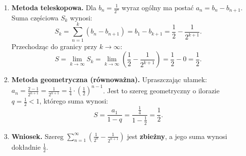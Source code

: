 \begin{enumerate}[label=\textbf{Krok \arabic*.},leftmargin=*]
    \item \textbf{Metoda teleskopowa.}
    Dla $b_n = \frac{1}{2^n}$ wyraz ogólny ma postać $a_n = b_n - b_{n+1}$. Suma częściowa $S_k$ wynosi:
    \begin{equation*}
        S_k = \sum_{n=1}^{k} (b_n - b_{n+1}) = b_1 - b_{k+1} = \frac{1}{2} - \frac{1}{2^{k+1}}.
    \end{equation*}
    Przechodząc do granicy przy $k \to \infty$:
    \begin{equation*}
        S = \lim_{k \to \infty} S_k = \lim_{k \to \infty} \left(\frac{1}{2} - \frac{1}{2^{k+1}}\right) = \frac{1}{2} - 0 = \frac{1}{2}.
    \end{equation*}
    \item \textbf{Metoda geometryczna (równoważna).}
    Upraszczając ułamek: $a_n = \frac{2 - 1}{2^{n+1}} = \frac{1}{2^{n+1}} = \frac{1}{4} \cdot \left(\frac{1}{2}\right)^{n-1}$. Jest to szereg geometryczny o ilorazie $q = \frac{1}{2} < 1$, którego suma wynosi:
    \begin{equation*}
        S = \frac{a_1}{1 - q} = \frac{\frac{1}{4}}{1 - \frac{1}{2}} = \frac{1}{2}.
    \end{equation*}
    \item \textbf{Wniosek.}
    Szereg $\displaystyle\sum_{n=1}^{\infty} \left(\frac{1}{2^n} - \frac{1}{2^{n+1}}\right)$ jest \textbf{zbieżny}, a jego suma wynosi dokładnie $\frac{1}{2}$.
\end{enumerate}

\vspace{0.2cm}

\begin{odpowiedzbox}
\begin{center}
\small
{}
\end{center}
\end{odpowiedzbox}
